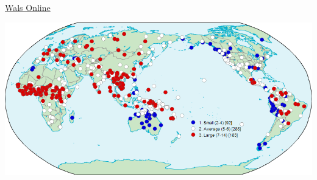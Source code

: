 \documentclass[
  letterpaper,
]{scrbook}
\begin{document}
\href{https://wals.info/}{Wals Online}

\includegraphics[width=1\textwidth,height=\textheight]{./pictures/01b_NSG_Intro_2020-10-07/wals_vowel_inventories.png}

~
\end{document}
